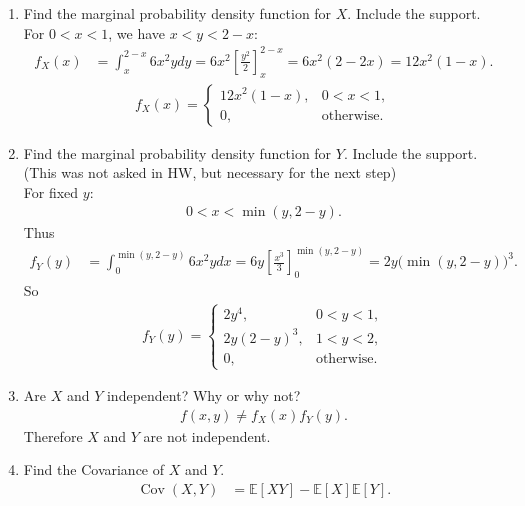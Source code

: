 \documentclass[12pt]{article} %
\newcommand{\Red}{\color{Red}}
\begin{document}
\begin{enumerate}
\begin{enumerate}[label=2.\arabic*]
{        }
		\item Find the marginal probability density function for $X$. Include the support.
        {\Red
        For $0<x<1$, we have $x<y<2-x$:
        \begin{align*}
        f_X(x)&=\int_{x}^{2-x} 6x^2ydy
        =6x^2\left[\frac{y^2}{2}\right]_{x}^{2-x}
        =6x^2(2-2x)
        =12x^2(1-x).
        \end{align*}
        \begin{align*}
        f_X(x)=
        \begin{cases}
        12x^2(1-x), & 0<x<1,\\
        0, & \text{otherwise}.
        \end{cases}
        \end{align*}
        }
		\item[] Find the marginal probability density function for $Y$. Include the support. (This was not asked in HW, but necessary for the next step)\\
        {\Red
        For fixed $y$:
        \begin{align*}
         0<x<\min(y,2-y).
        \end{align*}
        Thus
        \begin{align*}
        f_Y(y)
        &=\int_{0}^{\min(y,2-y)} 6x^2ydx
        =6y\left[\frac{x^3}{3}\right]_{0}^{\min(y,2-y)}
        =2y\big(\min(y,2-y)\big)^3.
        \end{align*}
        So
        \begin{align*}
        f_Y(y)=
        \begin{cases}
        2y^4, & 0<y<1,\\
        2y(2-y)^3, & 1<y<2,\\
        0, & \text{otherwise}.
        \end{cases}
        \end{align*}
        }
		\item Are $X$ and $Y$ independent? Why or why not? 
        {\Red
        \begin{align*}
        f(x,y)\neq f_X(x)f_Y(y).
        \end{align*}
        Therefore $X$ and $Y$ are not independent.
        }
		\item Find the Covariance of $X$ and $Y$. 
        {\Red
        \begin{align*}
        \operatorname{Cov}(X,Y)
        &=\mathbb E[XY]-\mathbb E[X]\mathbb E[Y].
        \end{align*}
        \begin{align*}

\end{align*}}
\end{enumerate}
\end{enumerate}
\end{document}
